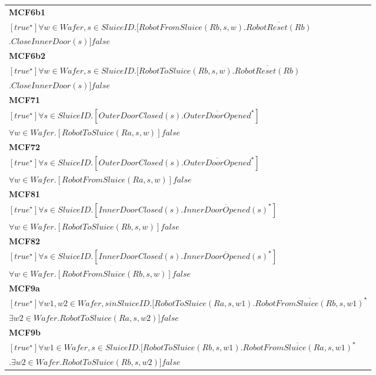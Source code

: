\documentclass[12pt]{report}
\begin{document}
\begin{longtable}{p{\textwidth}}
        \textbf{MCF6b1}\\
        $[true^{\star}] \forall w \in Wafer, s \in SluiceID.[RobotFromSluice(Rb,s,w).\overline{RobotReset(Rb)}$ \\
        $.CloseInnerDoor(s)]false$\\
        \hline

        \textbf{MCF6b2}\\
        $[true^{\star}] \forall w \in Wafer, s \in SluiceID.[RobotToSluice(Rb,s,w).\overline{RobotReset(Rb)}$ \\
        $.CloseInnerDoor(s)]false$\\
        \hline

        \textbf{MCF71}\\
        $[true^{\star}] \forall s \in SluiceID.[OuterDoorClosed(s).\overline{OuterDoorOpened}^{\star}]$ \\
        $\forall w \in Wafer. [RobotToSluice(Ra,s,w)]false$\\
        \hline

        \textbf{MCF72}\\
        $[true^{\star}] \forall s \in SluiceID.[OuterDoorClosed(s).\overline{OuterDoorOpened}^{\star}]$ \\
        $\forall w \in Wafer. [RobotFromSluice(Ra,s,w)]false$\\
        \hline

        \textbf{MCF81}\\
        $[true^{\star}] \forall s \in SluiceID.[InnerDoorClosed(s).\overline{InnerDoorOpened(s)}^{\star}]$ \\
        $\forall w \in Wafer. [RobotToSluice(Rb, s, w)]false$\\
        \hline

        \textbf{MCF82}\\
        $[true^{\star}] \forall s \in SluiceID.[InnerDoorClosed(s).\overline{InnerDoorOpened(s)}^{\star}]$ \\
        $\forall w \in Wafer. [RobotFromSluice(Rb, s, w)]false$\\
        \hline

        \textbf{MCF9a}\\
        $[true^{\star}] \forall w1,w2 \in Wafer, s in SluiceID.[RobotToSluice(Ra,s,w1).\overline{RobotFromSluice(Rb,s,w1)}^{\star}$ \\
        $\exists w2 \in Wafer. RobotToSluice(Ra,s,w2)]false$\\
        \hline

        \textbf{MCF9b}\\
        $[true^{\star}] \forall w1 \in Wafer, s \in SluiceID.[RobotToSluice(Rb,s,w1).\overline{RobotFromSluice(Ra,s,w1)}^{\star}$ \\
        $.\exists w2 \in Wafer. RobotToSluice(Rb,s,w2)]false$ \\
        \hline


\end{longtable}
\end{document}
